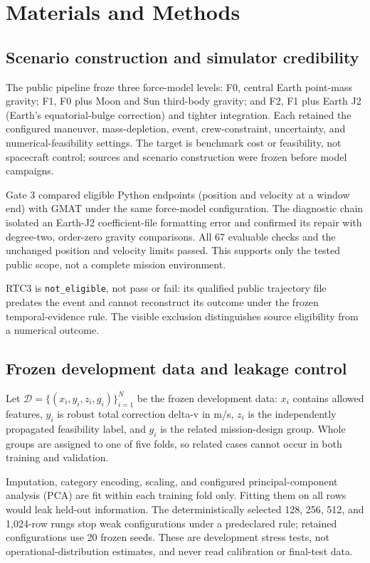 \section{Materials and Methods}
\label{sec:methods}

\subsection{Scenario construction and simulator credibility}

The public pipeline froze three force-model levels: F0, central Earth
point-mass gravity; F1, F0 plus Moon and Sun third-body gravity; and F2, F1
plus Earth J2 (Earth's equatorial-bulge correction) and tighter integration.
Each retained the configured maneuver, mass-depletion, event, crew-constraint,
uncertainty, and numerical-feasibility settings. The target is benchmark cost
or feasibility, not spacecraft control; sources and scenario construction were
frozen before model campaigns.

Gate 3 compared eligible Python endpoints (position and velocity at a window
end) with GMAT under the same force-model configuration. The
diagnostic chain isolated an Earth-J2 coefficient-file formatting error and
confirmed its repair with degree-two, order-zero gravity comparisons. All 67
evaluable checks and the unchanged position and velocity limits passed. This
supports only the tested public scope, not a complete mission environment.

RTC3 is \texttt{not\_eligible}, not pass or fail: its qualified public
trajectory file predates the event and cannot reconstruct its outcome under the
frozen temporal-evidence rule. The visible exclusion distinguishes source
eligibility from a numerical outcome.

\subsection{Frozen development data and leakage control}

Let $\mathcal{D}=\{(x_i,y_i,z_i,g_i)\}_{i=1}^{N}$ be the frozen development
data: $x_i$ contains allowed features, $y_i$ is robust total correction delta-v
in m/s, $z_i$ is the independently propagated feasibility label, and $g_i$ is
the related mission-design group. Whole groups are assigned to one of five
folds, so related cases cannot occur in both training and validation.

Imputation, category encoding, scaling, and configured principal-component
analysis (PCA) are fit within each training fold only.
Fitting them on all rows would leak held-out information. The deterministically
selected 128, 256, 512, and 1,024-row rungs stop weak configurations under a
predeclared rule; retained configurations use 20 frozen seeds. These are
development stress tests, not operational-distribution estimates, and never
read calibration or final-test data.

